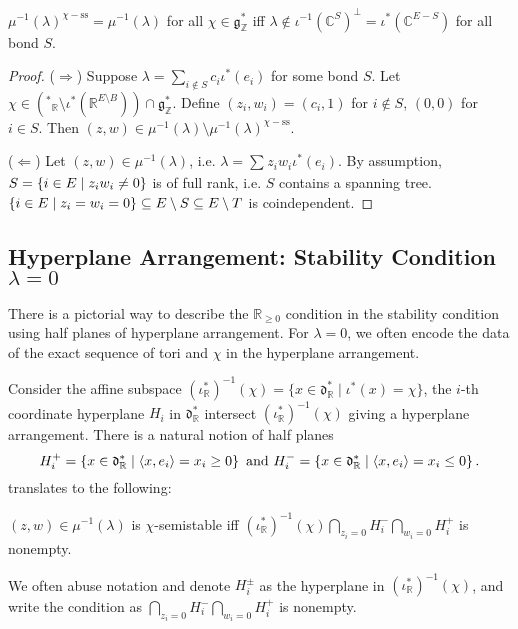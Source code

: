 \documentclass[b5paper]{article}
\newcommand{\mathintitle}[1]{\texorpdfstring{$#1$}{\detokenize{#1}}}
\newcommand{\del}{\setminus}
\newcommand{\sstab}{\mathrm{ss}}
\begin{document}
\begin{proposition}[pps:]{}
  $\mu^{-1}(\lambda)^{\chi-\sstab}=\mu^{-1}(\lambda)$ for all $\chi\in \mathfrak{g}^*_{\mathbb{Z}}$ iff $\lambda\notin \iota^{-1}(\mathbb{C}^S)^\perp=\iota^*(\mathbb{C}^{E-S})$ for all bond $S$.
  \begin{proof}
    ($\Rightarrow $) Suppose $\lambda=\sum_{i\notin S}^{}c_i\iota^*(e_i)$ for some bond $S$. Let $\chi\in (\mathfrak{^*}_\mathbb{R}\setminus \iota^*(\mathbb{R}^{E\del B})) \cap \mathfrak{g}^*_\mathbb{Z}$. Define $(z_i,w_i)=(c_i,1)$ for $i\notin S$, $(0,0)$ for $i\in S$. Then $(z,w)\in \mu^{-1}(\lambda)\setminus \mu^{-1}(\lambda)^{\chi-\sstab}$.

    ($\Leftarrow $) Let $(z,w)\in \mu^{-1}(\lambda)$, i.e. $\lambda=\sum_{}^{}z_iw_i\iota^*(e_i)$. By assumption, $S=\left\{i\in E\mid z_iw_i\neq 0\right\}$ is of full rank, i.e. $S$ contains a spanning tree. $\CB{i\in E\mid z_i=w_i=0}\subseteq E\del S\subseteq E\del T$ is coindependent.
  \end{proof}
\end{proposition}

\subsection{Hyperplane Arrangement: Stability Condition \mathintitle{\lambda=0}}
\label{sec:hyperplane_arrangement}

There is a pictorial way to describe the $\mathbb{R}_{\geq 0}$ condition in the stability condition using half planes of hyperplane arrangement.
For $\lambda=0$, we often encode the data of the exact sequence of tori and $\chi$ in the hyperplane arrangement. 

Consider the affine subspace $ (\iota_{\mathbb{R}}^*)^{-1}(\chi) = \{ x \in \mathfrak{d}_{\mathbb{R}}^* \mid \iota^*(x) = \chi \} $, the $i$-th coordinate hyperplane $H_i$ in $\mathfrak{d}_\mathbb{R}^*$ intersect $(\iota_{\mathbb{R}}^*)^{-1}(\chi)$ giving a hyperplane arrangement. There is a natural notion of half planes 
\[
H_i^+=\left\{x\in \mathfrak{d}^*_\mathbb{R}\mid \langle x,e_i\rangle=x_i\geq 0\right\}
\textnormal{ and }
H_i^-=\left\{x\in \mathfrak{d}^*_\mathbb{R}\mid \langle x,e_i\rangle=x_i\leq 0\right\}.
\]
 translates to the following:

\begin{lemma}[lem:]{}
  $(z,w)\in \mu^{-1}(\lambda)$ is $\chi$-semistable iff $(\iota_{\mathbb{R}}^*)^{-1}(\chi)\bigcap _{z_i=0}H_i^-\bigcap _{w_i=0}H_i^+$ is nonempty. 
  \begin{remark}
    We often abuse notation and denote $H_i^{\pm}$ as the hyperplane in $(\iota^*_{\mathbb{R}})^{-1}(\chi)$, and write the condition as $\bigcap _{z_i=0}H_i^-\bigcap _{w_i=0}H_i^+$ is nonempty. 
  \end{remark}
\end{lemma}
\end{document}

